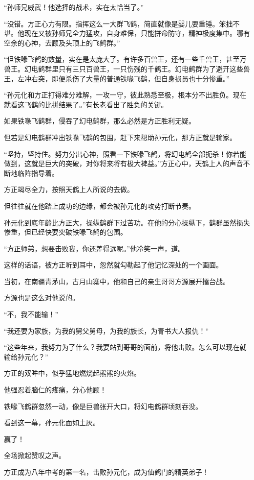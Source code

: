 \begin{this_body}
“孙师兄威武！他选择的战术，实在太恰当了。”

“没错。方正心力有限。指挥这么一大群飞鹤，简直就像是婴儿耍重锤。笨拙不堪。他现在又被孙师兄全力猛攻，自身难保，只能拼命防守，精神极度集中。哪有空余的心神，去顾及头顶上的飞鹤群。”

“但铁喙飞鹤的数量，实在是太庞大了。有许多百兽王，还有一些千兽王，甚至万兽王。幻电鹤群里只有三只百兽王，一只伤残的千鹤王。幻电鹤群为了避开这些兽王，左冲右突，即便杀伤了大量的普通铁喙飞鹤，但自身损员也十分惨重。”

“孙元化和方正打得难分难解，一攻一守，彼此熟悉至极，根本分不出胜负。现在就看这飞鹤的比拼结果了。”有长老看出了胜负的关键。

如果铁喙飞鹤群，侵吞了幻电鹤群，那么必然是方正胜利无疑。

但若是幻电鹤群冲出铁喙飞鹤的包围，赶下来帮助孙元化，那方正就是输家。

“坚持，坚持住。努力分出心神，照看一下铁喙飞鹤，将幻电鹤全部扼杀！你若能做到，这就是巨大的突破，对你将来将有极大裨益。”方正心中，天鹤上人的声音不断地临阵指导着。

方正竭尽全力，按照天鹤上人所说的去做。

但往往就在他踏上成功的边缘，都会被孙元化的攻势打断节奏。

孙元化到底年龄比方正大，操纵鹤群下过苦功。在他的分心操纵下，鹤群虽然损失惨重，但已经快要突破铁喙飞鹤的包围。

“方正师弟，想要击败我，你还差得远呢。”他冷笑一声，道。

这样的话语，被方正听到耳中，忽然就勾勒起了他记忆深处的一个画面。

当初，在南疆青茅山，古月山寨中，他和自己的亲生哥哥方源展开擂台战。

方源也是这么对他说的。

“不，我不能输！”

“我还要为家族，为我的舅父舅母，为我的族长，为青书大人报仇！”

“这些年来，我努力为了什么？我要站到哥哥的面前，将他击败。怎么可以现在就输给孙元化？”

方正的双眸中，似乎猛地燃烧起熊熊的火焰。

他强忍着脑仁的疼痛，分心他顾！

铁喙飞鹤群忽然一动，像是巨兽张开大口，将幻电鹤群顷刻吞没。

看到这一幕，孙元化面如土灰。

赢了！

全场掀起赞叹之声。

方正成为八年中考的第一名，击败孙元化，成为仙鹤门的精英弟子！

\end{this_body}

